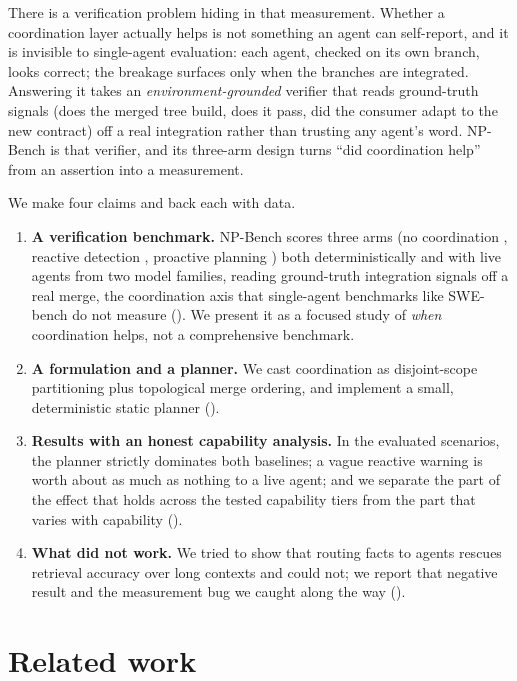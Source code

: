 There is a verification problem hiding in that measurement. Whether a coordination layer actually
helps is not something an agent can self-report, and it is invisible to single-agent evaluation: each
agent, checked on its own branch, looks correct; the breakage surfaces only when the branches are
integrated. Answering it takes an \emph{environment-grounded} verifier that reads ground-truth
signals (does the merged tree build, does it pass, did the consumer adapt to the new
contract) off a real integration rather than trusting any agent's word. NP-Bench is that verifier,
and its three-arm design turns ``did coordination help'' from an assertion into a measurement.

We make four claims and back each with data.
\begin{enumerate}[leftmargin=1.4em,itemsep=1pt,topsep=2pt]
\item \textbf{A verification benchmark.} NP-Bench scores three arms (no coordination , reactive
detection , proactive planning ) both deterministically and with live
agents from two model families, reading ground-truth integration signals off a real merge, the
coordination axis that single-agent benchmarks like SWE-bench do not measure (). We
present it as a focused study of \emph{when} coordination helps, not a comprehensive benchmark.
\item \textbf{A formulation and a planner.} We cast coordination as disjoint-scope partitioning plus
topological merge ordering, and implement a small, deterministic static planner
().
\item \textbf{Results with an honest capability analysis.} In the evaluated scenarios, the planner
strictly dominates both baselines; a vague reactive warning is worth about as much as nothing to a
live agent; and we separate the part of the effect that holds across the tested capability tiers
from the part that varies with capability
().
\item \textbf{What did not work.} We tried to show that routing facts to agents rescues retrieval
accuracy over long contexts and could not; we report that negative result and the measurement bug we
caught along the way ().
\end{enumerate}

\section{Related work}
\label{sec:related}

